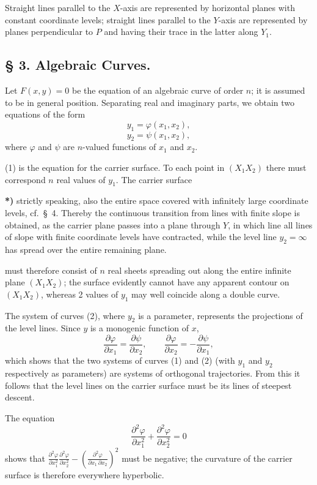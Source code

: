 \documentclass{article}
\begin{document}
Straight lines parallel to the $X$-axis are represented by horizontal planes with constant coordinate levels; straight lines parallel to the $Y$-axis are represented by planes perpendicular to $P$ and having their trace in the latter along $Y_1$.

\subsection*{§ 3. Algebraic Curves.}

Let $F(x, y) = 0$ be the equation of an algebraic curve of order $n$; it is assumed to be in general position. Separating real and imaginary parts, we obtain two equations of the form
\[
y_1 = \varphi(x_1, x_2), \tag{1}
\]
\[
y_2 = \psi(x_1, x_2), \tag{2}
\]
where $\varphi$ and $\psi$ are $n$-valued functions of $x_1$ and $x_2$.

(1) is the equation for the carrier surface. To each point in $(X_1 X_2)$ there must correspond $n$ real values of $y_1$. The carrier surface

\textbf{*)} strictly speaking, also the entire space covered with infinitely large coordinate levels, cf.\ §~4. Thereby the continuous transition from lines with finite slope is obtained, as the carrier plane passes into a plane through $Y$, in which line all lines of slope with finite coordinate levels have contracted, while the level line $y_2 = \infty$ has spread over the entire remaining plane.

must therefore consist of $n$ real sheets spreading out along the entire infinite plane $(X_1 X_2)$; the surface evidently cannot have any apparent contour on $(X_1 X_2)$, whereas 2 values of $y_1$ may well coincide along a double curve.

The system of curves (2), where $y_2$ is a parameter, represents the projections of the level lines. Since $y$ is a monogenic function of $x$,
\[
\frac{\partial \varphi}{\partial x_1} = \frac{\partial \psi}{\partial x_2}, \qquad
\frac{\partial \varphi}{\partial x_2} = -\frac{\partial \psi}{\partial x_1},
\]
which shows that the two systems of curves (1) and (2) (with $y_1$ and $y_2$ respectively as parameters) are systems of orthogonal trajectories. From this it follows that the level lines on the carrier surface must be its lines of steepest descent.

The equation
\[
\frac{\partial^2 \varphi}{\partial x_1^2} + \frac{\partial^2 \varphi}{\partial x_2^2} = 0
\]
shows that $\frac{\partial^2 \varphi}{\partial x_1^2} \frac{\partial^2 \varphi}{\partial x_2^2} - \left(\frac{\partial^2 \varphi}{\partial x_1\,\partial x_2}\right)^2$ must be negative; the curvature of the carrier surface is therefore everywhere hyperbolic.
\end{document}
